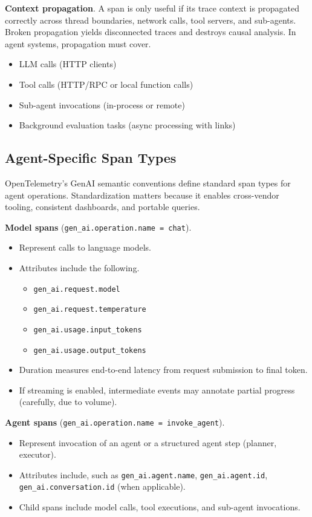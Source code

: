 \textbf{Context propagation}. A span is only useful if its trace context is propagated correctly across thread boundaries, network calls, tool servers, and sub-agents. Broken propagation yields disconnected traces and destroys causal analysis. In agent systems, propagation must cover.
\begin{itemize}
\item LLM calls (HTTP clients)
\item Tool calls (HTTP/RPC or local function calls)
\item Sub-agent invocations (in-process or remote)
\item Background evaluation tasks (async processing with links)
\end{itemize}

\subsection{Agent-Specific Span Types}

OpenTelemetry's GenAI semantic conventions \cite{otelgenai2025} define standard span types for agent operations. Standardization matters because it enables cross-vendor tooling, consistent dashboards, and portable queries.

\textbf{Model spans} (\texttt{gen\_ai.operation.name = chat}).
\begin{itemize}
\item Represent calls to language models.
\item Attributes include the following.
\begin{itemize}
\item \texttt{gen\_ai.request.model}
\item \texttt{gen\_ai.request.temperature}
\item \texttt{gen\_ai.usage.input\_tokens}
\item \texttt{gen\_ai.usage.output\_tokens}
\end{itemize}
\item Duration measures end-to-end latency from request submission to final token.
\item If streaming is enabled, intermediate events may annotate partial progress (carefully, due to volume).
\end{itemize}

\textbf{Agent spans} (\texttt{gen\_ai.operation.name = invoke\_agent}).
\begin{itemize}
\item Represent invocation of an agent or a structured agent step (planner, executor).
\item Attributes include, such as \texttt{gen\_ai.agent.name},
  \texttt{gen\_ai.agent.id},
  \texttt{gen\_ai.conversation.id} (when applicable).
\item Child spans include model calls, tool executions, and sub-agent invocations.
\end{itemize}

